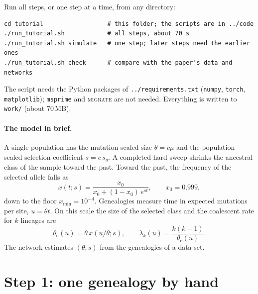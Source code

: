 \documentclass[11pt]{article}
\newcommand{\file}[1]{\texttt{#1}}
\newcommand{\migrate}{\textsc{migrate}\xspace}
\begin{document}
Run all steps, or one step at a time, from any directory:
\begin{lstlisting}
cd tutorial                  # this folder; the scripts are in ../code
./run_tutorial.sh            # all steps, about 70 s
./run_tutorial.sh simulate   # one step; later steps need the earlier ones
./run_tutorial.sh check      # compare with the paper's data and networks
\end{lstlisting}
The script needs the Python packages of \file{../requirements.txt}
(\texttt{numpy}, \texttt{torch}, \texttt{matplotlib}); \texttt{msprime}
and \migrate are not needed. Everything is written to
\file{work/} (about 70\,MB).

\paragraph{The model in brief.}
A single population has the mutation-scaled size $\theta{=}c\mu$ and
the population-scaled selection coefficient $s{=}c\,s_g$.
A completed hard sweep shrinks the ancestral class of the sample toward
the past.
Toward the past, the frequency of the selected allele falls as
\begin{equation}
x(t;s) = \frac{x_0}{x_0 + (1-x_0)\,e^{st}}, \qquad x_0 = 0.999,
\label{eq:xtraj}
\end{equation}
down to the floor $x_{\min}{=}10^{-4}$.
Genealogies measure time in expected mutations per site, $u{=}\theta t$.
On this scale the size of the selected class and the coalescent rate for
$k$ lineages are
\begin{equation}
\theta_{\text{e}}(u) = \theta\,x(u/\theta;s), \qquad
\lambda_k(u) = \frac{k(k-1)}{\theta_{\text{e}}(u)} .
\label{eq:rate}
\end{equation}
The network estimates $(\theta,s)$ from the genealogies of a data set.

\section{Step 1: one genealogy by hand}\label{sec:step1}
\end{document}
